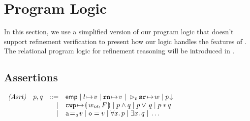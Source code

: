 \section{Program Logic}
\label{sec:logic}

In this section,
we use a simplified version of our program logic
that doesn't support refinement verification to
present how our logic handles the
features of \sparc{}. 
The relational program logic for  
refinement reasoning will be introduced in  
\Sec{\ref{sec:refine-verification-sparc}}.


\subsection{Assertions}
\label{subsec:assertions}

\begin{center}
	$
		\begin{array}{rrcl}
			\textit{(Asrt)} & \astP, \astQ & \define &
			\aemp \sepline
			\msto{l}{\val} \sepline
			\regst{\regN}{\val} \sepline
			\dlyregst{t}{\sr}{\word} \sepline
			\asrttm{p} \\
			& & \ \ \ | &
			\frmst{\cwp}{F} \sepline
			\astP \wedge \astQ \sepline
			\astP \vee \, \astQ \sepline
			\astP \sepstar \astQ \\
			& & \ \ \ | &
			\aexp \addrEq \val \sepline
			\oexp = \val \sepline
			\forall x. \, \astP \sepline
			\exists x. \, \astQ \sepline
            \dots
		\end{array}
	$
	\label{fig:Syntax of Assertions}
	\vspace{-0.5em}
\end{center}



